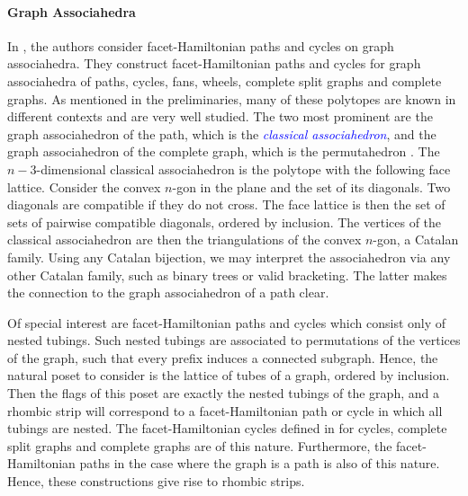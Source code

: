 \documentclass[fontsize=11pt,a4paper,DIV=12]{scrartcl}
\newcommand{\defn}[1]{\textsl{\textcolor{Blue}{#1}}}
\begin{document}
\paragraph{Graph Associahedra}
In \cite{facethamiltonicity}, the authors consider facet-Hamiltonian paths and cycles on graph associahedra. They construct facet-Hamiltonian paths and cycles for graph associahedra of paths, cycles, fans, wheels, complete split graphs and complete graphs. As mentioned in the preliminaries, many of these polytopes are known in different contexts and are very well studied. The two most prominent are the graph associahedron of the path, which is the \defn{classical associahedron}, and the graph associahedron of the complete graph, which is the permutahedron \cite{Associahedron, Associahedra_spines, Associahedra_diameter, Associahedron_realizations, Associahedron_non_leaving_face}. The $n-3$-dimensional classical associahedron is the polytope with the following face lattice. Consider the convex $n$-gon in the plane and the set of its diagonals. Two diagonals are compatible if they do not cross. The face lattice is then the set of sets of pairwise compatible diagonals, ordered by inclusion. The vertices of the classical associahedron are then the triangulations of the convex $n$-gon, a Catalan family. Using any Catalan bijection, we may interpret the associahedron via any other Catalan family, such as binary trees or valid bracketing. The latter makes the connection to the graph associahedron of a path clear.

Of special interest are facet-Hamiltonian paths and cycles which consist only of nested tubings. Such nested tubings are associated to permutations of the vertices of the graph, such that every prefix induces a connected subgraph. Hence, the natural poset to consider is the lattice of tubes of a graph, ordered by inclusion. Then the flags of this poset are exactly the nested tubings of the graph, and a rhombic strip will correspond to a facet-Hamiltonian path or cycle in which all tubings are nested. The facet-Hamiltonian cycles defined in \cite{facethamiltonicity} for cycles, complete split graphs and complete graphs are of this nature. Furthermore, the facet-Hamiltonian paths in the case where the graph is a path is also of this nature. Hence, these constructions give rise to rhombic strips.
\end{document}
